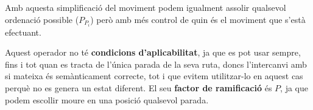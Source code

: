 Amb aquesta simplificació del moviment podem igualment assolir qualsevol ordenació possible ($P_{P_i}$) però amb més control de quin és el moviment que s'està efectuant.

Aquest operador no té \textbf{condicions d'aplicabilitat}, ja que es pot usar sempre, fins i tot quan es tracta de l'única parada de la seva ruta, doncs l'intercanvi amb si mateixa és semànticament correcte, tot i que evitem utilitzar-lo en aquest cas perquè no es genera un estat diferent. El seu \textbf{factor de ramificació} és $P$, ja que podem escollir moure en una posició qualsevol parada.


